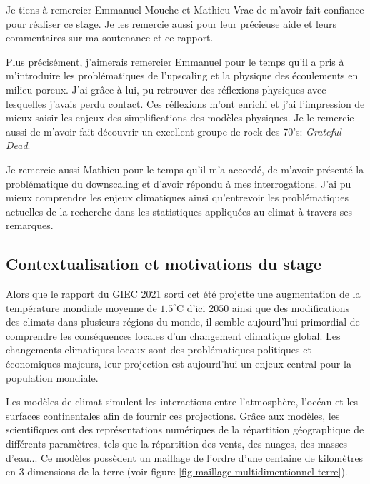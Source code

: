 \documentclass[a4paper,11pt]{article}
\numberwithin{equation}{section}
\begin{document}
Je tiens à remercier Emmanuel Mouche et Mathieu Vrac de m'avoir fait confiance pour réaliser ce stage. Je les remercie aussi pour leur précieuse aide et leurs commentaires sur ma soutenance et ce rapport.

\vspace{0.4cm} 

Plus précisément, j'aimerais remercier Emmanuel pour le temps qu'il a pris à m'introduire les problématiques de l'upscaling et la physique des écoulements en milieu poreux. J'ai grâce à lui, pu retrouver des réflexions physiques avec lesquelles j'avais perdu contact. Ces réflexions m'ont enrichi et j'ai l'impression de mieux saisir les enjeux des simplifications des modèles physiques. Je le remercie aussi de m'avoir fait découvrir un excellent groupe de rock des 70's: \textit{Grateful Dead}.

Je remercie aussi Mathieu pour le temps qu'il m'a accordé, de m'avoir présenté la problématique du downscaling et d'avoir répondu à mes interrogations. J'ai pu mieux comprendre les enjeux climatiques ainsi qu'entrevoir les problématiques actuelles de la recherche dans les statistiques appliquées au climat à travers ses remarques.    


\subsection{Contextualisation et motivations du stage}
\label{ch:Contextualisation et motivations du stage}

Alors que le rapport du GIEC 2021 sorti cet été projette une augmentation de la température mondiale moyenne de $1.5^{\circ}$C d'ici $2050$ ainsi que des modifications des climats dans plusieurs régions du monde, il semble aujourd'hui primordial de comprendre les conséquences locales d'un changement climatique global. Les changements climatiques locaux sont des problématiques politiques et économiques majeurs, leur projection est aujourd'hui un enjeux central pour la population mondiale.

Les modèles de climat simulent les interactions entre l'atmosphère, l'océan et les surfaces continentales afin de fournir ces projections. Grâce aux modèles, les scientifiques ont des représentations numériques de la répartition géographique de différents paramètres, tels que la répartition des vents, des nuages, des masses d'eau... Ce modèles possèdent un maillage de l'ordre d'une centaine de kilomètres en $3$ dimensions de la terre (voir figure \ref{fig-maillage multidimentionnel terre}).
\end{document}
